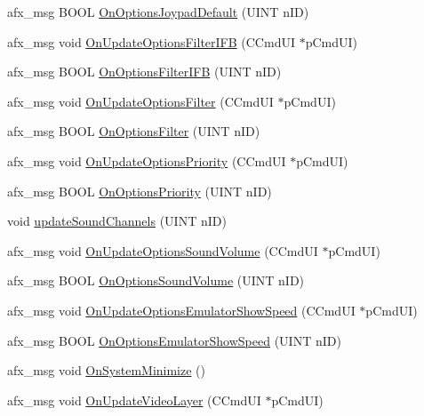 \begin{DoxyCompactItemize}
\item 
afx\+\_\+msg B\+O\+OL \mbox{\hyperlink{class_main_wnd_a4c5c9c58649b58fb32119749fe2f2d18}{On\+Options\+Joypad\+Default}} (U\+I\+NT n\+ID)
\item 
afx\+\_\+msg void \mbox{\hyperlink{class_main_wnd_a526505f41dd67ef0c1971aa6825af564}{On\+Update\+Options\+Filter\+I\+FB}} (C\+Cmd\+UI $\ast$p\+Cmd\+UI)
\item 
afx\+\_\+msg B\+O\+OL \mbox{\hyperlink{class_main_wnd_ac08824702182bf311a093c5aa39936ef}{On\+Options\+Filter\+I\+FB}} (U\+I\+NT n\+ID)
\item 
afx\+\_\+msg void \mbox{\hyperlink{class_main_wnd_aa85c55f64e32373f8478ca899aa31ba7}{On\+Update\+Options\+Filter}} (C\+Cmd\+UI $\ast$p\+Cmd\+UI)
\item 
afx\+\_\+msg B\+O\+OL \mbox{\hyperlink{class_main_wnd_adfab8994e984c069ace4f06dafcbfbd1}{On\+Options\+Filter}} (U\+I\+NT n\+ID)
\item 
afx\+\_\+msg void \mbox{\hyperlink{class_main_wnd_ad41b7cfd6de150a00d8fd50b498b0a96}{On\+Update\+Options\+Priority}} (C\+Cmd\+UI $\ast$p\+Cmd\+UI)
\item 
afx\+\_\+msg B\+O\+OL \mbox{\hyperlink{class_main_wnd_a98477c70a1ecbeacd3972419972d713e}{On\+Options\+Priority}} (U\+I\+NT n\+ID)
\item 
void \mbox{\hyperlink{class_main_wnd_a30b67d9db53d79122684a81e549ebd1c}{update\+Sound\+Channels}} (U\+I\+NT n\+ID)
\item 
afx\+\_\+msg void \mbox{\hyperlink{class_main_wnd_a552ffff0119f7cb71c14eb321cec4a4f}{On\+Update\+Options\+Sound\+Volume}} (C\+Cmd\+UI $\ast$p\+Cmd\+UI)
\item 
afx\+\_\+msg B\+O\+OL \mbox{\hyperlink{class_main_wnd_ae784df9d960de0aed023ebfdd444e979}{On\+Options\+Sound\+Volume}} (U\+I\+NT n\+ID)
\item 
afx\+\_\+msg void \mbox{\hyperlink{class_main_wnd_accdf36d9ca8700e9e49ecd1432de6c11}{On\+Update\+Options\+Emulator\+Show\+Speed}} (C\+Cmd\+UI $\ast$p\+Cmd\+UI)
\item 
afx\+\_\+msg B\+O\+OL \mbox{\hyperlink{class_main_wnd_a5f538c28cfe7007a8dd651215f6e4768}{On\+Options\+Emulator\+Show\+Speed}} (U\+I\+NT n\+ID)
\item 
afx\+\_\+msg void \mbox{\hyperlink{class_main_wnd_a0fe0ca31c45bc8041267a67eabb9f28e}{On\+System\+Minimize}} ()
\item 
afx\+\_\+msg void \mbox{\hyperlink{class_main_wnd_a559482a80b53127046816f476257cbc7}{On\+Update\+Video\+Layer}} (C\+Cmd\+UI $\ast$p\+Cmd\+UI)
\item 

\end{DoxyCompactItemize}
